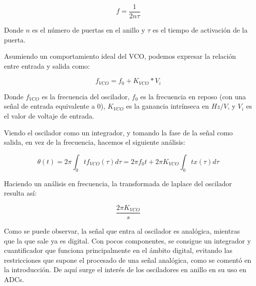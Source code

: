 \documentclass[12pt]{report} %
\begin{document}
	\begin{figure}[h]
		\begin{equation}
		\label{vco-freq-sw-t}
		f = \frac{1}{2 n \tau}
		\end{equation}
		\footnotemark
	\end{figure}
	
	Donde $n$ es el número de puertas en el anillo y $\tau$ es el tiempo de activación de la puerta.
	
	Asumiendo un comportamiento ideal del VCO, podemos expresar la relación entre entrada y salida como:
	\begin{figure}[h]
		\begin{equation}
		\label{vco-freq-ideal}
		f_{VCO}= f_{0} + K_{VCO} * V_{i}
		\end{equation}
		\footnotemark
	\end{figure}
	
	Donde $f_{VCO}$ es la frecuencia del oscilador, $f_{0}$ es la frecuencia en reposo (con una señal de entrada equivalente a 0), $K_{VCO}$ es la ganancia intrínseca en $Hz/V$, y $V_{i}$ es el valor de voltaje de entrada.
	
	Viendo el oscilador como un integrador, y tomando la fase de la señal como salida, en vez de la frecuencia, hacemos el siguiente análisis:
	
	\begin{figure}[h]
		\begin{equation}
		\label{vco-phase}
		\theta(t) = 2\pi\int_{0}{t}f_{VCO}(\tau)d\tau = 2\pi f_{0}t + 2\pi K_{VCO}\int_{0}{t}x(\tau)d\tau
		\end{equation}
		\footnotemark
	\end{figure}
	
	Haciendo un análisis en frecuencia, la transformada de laplace del oscilador resulta así:
	
	\begin{figure}[h]
		\begin{equation}
		\label{vco-laplace}
		\frac{2 \pi K_{VCO}}{s}
		\end{equation}
		\footnotemark
	\end{figure}
	

	Como se puede observar, la señal que entra al oscilador es analógica, mientras que la que sale ya es digital. Con pocos componentes, se consigue un integrador y cuantificador que funciona principalmente en el ámbito digital, evitando las restricciones que supone el procesado de una señal analógica, como se comentó en la introducción. De aquí surge el interés de los osciladores en anillo en su uso en ADCs.
	
\end{document}
